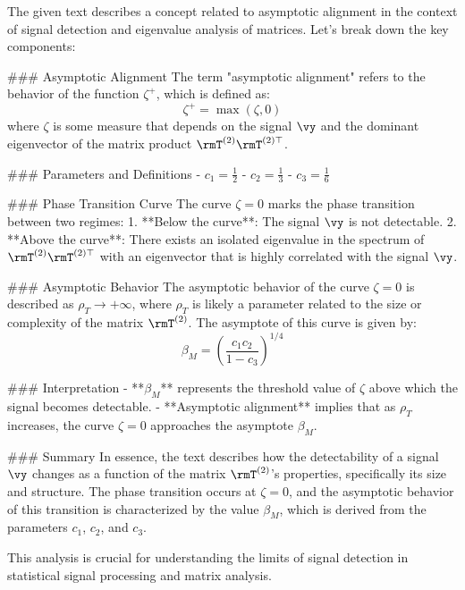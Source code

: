 The given text describes a concept related to asymptotic alignment in the context of signal detection and eigenvalue analysis of matrices. Let's break down the key components:

### Asymptotic Alignment
The term "asymptotic alignment" refers to the behavior of the function \(\zeta^+\), which is defined as:
\[
\zeta^+ = \max(\zeta, 0)
\]
where \(\zeta\) is some measure that depends on the signal \(\vy\) and the dominant eigenvector of the matrix product \(\rmT^{(2)} \rmT^{(2) \top}\).

### Parameters and Definitions
- \(c_1 = \frac{1}{2}\)
- \(c_2 = \frac{1}{3}\)
- \(c_3 = \frac{1}{6}\)

### Phase Transition Curve
The curve \(\zeta = 0\) marks the phase transition between two regimes:
1. **Below the curve**: The signal \(\vy\) is not detectable.
2. **Above the curve**: There exists an isolated eigenvalue in the spectrum of \(\rmT^{(2)} \rmT^{(2) \top}\) with an eigenvector that is highly correlated with the signal \(\vy\).

### Asymptotic Behavior
The asymptotic behavior of the curve \(\zeta = 0\) is described as \(\rho_T \to +\infty\), where \(\rho_T\) is likely a parameter related to the size or complexity of the matrix \(\rmT^{(2)}\). The asymptote of this curve is given by:
\[
\beta_M = \left(\frac{c_1 c_2}{1 - c_3}\right)^{1/4}
\]

### Interpretation
- **\(\beta_M\)** represents the threshold value of \(\zeta\) above which the signal becomes detectable.
- **Asymptotic alignment** implies that as \(\rho_T\) increases, the curve \(\zeta = 0\) approaches the asymptote \(\beta_M\).

### Summary
In essence, the text describes how the detectability of a signal \(\vy\) changes as a function of the matrix \(\rmT^{(2)}\)'s properties, specifically its size and structure. The phase transition occurs at \(\zeta = 0\), and the asymptotic behavior of this transition is characterized by the value \(\beta_M\), which is derived from the parameters \(c_1\), \(c_2\), and \(c_3\).

This analysis is crucial for understanding the limits of signal detection in statistical signal processing and matrix analysis.